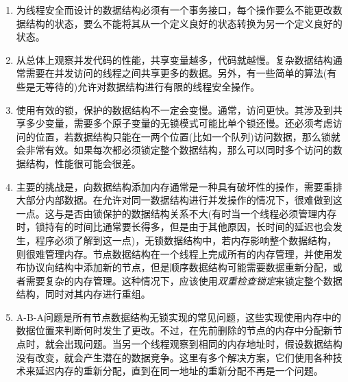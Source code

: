 \begin{enumerate}
\item 
为线程安全而设计的数据结构必须有一个事务接口，每个操作要么不能更改数据结构的状态，要么不能将其从一个定义良好的状态转换为另一个定义良好的状态。

\item 
从总体上观察并发代码的性能，共享变量越多，代码就越慢。复杂数据结构通常需要在并发访问的线程之间共享更多的数据。另外，有一些简单的算法(有些是无等待的)允许对数据结构进行有限的线程安全操作。

\item 
使用有效的锁，保护的数据结构不一定会变慢。通常，访问更快。其涉及到共享多少变量，需要多个原子变量的无锁模式可能比单个锁还慢。还必须考虑访问的位置，若数据结构只能在一两个位置(比如一个队列)访问数据，那么锁就会非常有效。如果每次都必须锁定整个数据结构，那么可以同时多个访问的数据结构，性能很可能会很差。

\item
主要的挑战是，向数据结构添加内存通常是一种具有破坏性的操作，需要重排大部分内部数据。在允许对同一数据结构进行并发操作的情况下，很难做到这一点。这与是否由锁保护的数据结构关系不大(有时当一个线程必须管理内存时，锁持有的时间比通常要长得多，但是由于其他原因，长时间的延迟也会发生，程序必须了解到这一点)，无锁数据结构中，若内存影响整个数据结构，则很难管理内存。节点数据结构在一个线程上完成所有的内存管理，并使用发布协议向结构中添加新的节点，但是顺序数据结构可能需要数据重新分配，或者需要复杂的内存管理。这种情况下，应该使用\textit{双重检查锁定}来锁定整个数据结构，同时对其内存进行重组。

\item
A-B-A问题是所有节点数据结构无锁实现的常见问题，这些实现使用内存中的数据位置来判断何时发生了更改。不过，在先前删除的节点的内存中分配新节点时，就会出现问题。当另一个线程观察到相同的内存地址时，假设数据结构没有改变，就会产生潜在的数据竞争。这里有多个解决方案，它们使用各种技术来延迟内存的重新分配，直到在同一地址的重新分配不再是一个问题。

\end{enumerate}